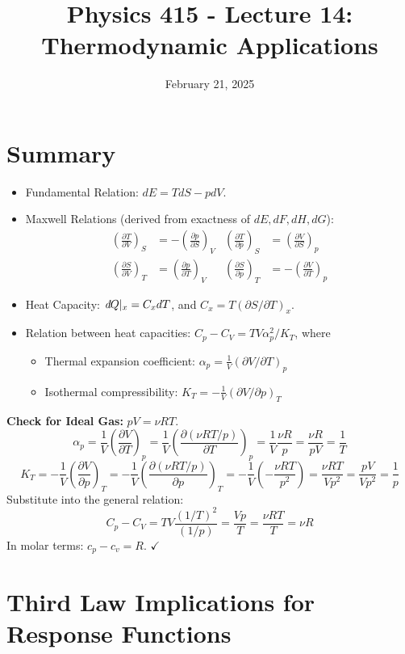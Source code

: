 \documentclass[11pt]{article}
\title{Physics 415 - Lecture 14: Thermodynamic Applications}
\date{February 21, 2025}
\author{} %
\newcommand{\pderiv}[2]{\frac{\partial #1}{\partial #2}}
\newcommand{\ethbar}{\text{\it{đ}}} %
\newcommand{\gasR}{R} %
\begin{document}
\maketitle
\thispagestyle{empty}

\section*{Summary}

\begin{itemize}
    \item Fundamental Relation: $dE = T dS - p dV$.
    \item Maxwell Relations (derived from exactness of $dE, dF, dH, dG$):
    \begin{align*} \left( \pderiv{T}{V} \right)_S &= - \left( \pderiv{p}{S} \right)_V & \left( \pderiv{T}{p} \right)_S &= \left( \pderiv{V}{S} \right)_p \\ \left( \pderiv{S}{V} \right)_T &= \left( \pderiv{p}{T} \right)_V & \left( \pderiv{S}{p} \right)_T &= -\left( \pderiv{V}{T} \right)_p \end{align*}
    \item Heat Capacity: $\ethbar Q|_x = C_x dT$, and $C_x = T (\partial S / \partial T)_x$.
    \item Relation between heat capacities: $C_p - C_V = TV \alpha_p^2 / K_T$, where
    \begin{itemize}
        \item Thermal expansion coefficient: $\alpha_p = \frac{1}{V} (\partial V / \partial T)_p$
        \item Isothermal compressibility: $K_T = -\frac{1}{V} (\partial V / \partial p)_T$
    \end{itemize}
\end{itemize}

\textbf{Check for Ideal Gas:} $pV = \nu \gasR T$.
\[ \alpha_p = \frac{1}{V} \left( \pderiv{V}{T} \right)_p = \frac{1}{V} \left( \pderiv{(\nu \gasR T/p)}{T} \right)_p = \frac{1}{V} \frac{\nu \gasR}{p} = \frac{\nu \gasR}{pV} = \frac{1}{T} \]
\[ K_T = -\frac{1}{V} \left( \pderiv{V}{p} \right)_T = -\frac{1}{V} \left( \pderiv{(\nu \gasR T/p)}{p} \right)_T = -\frac{1}{V} \left( -\frac{\nu \gasR T}{p^2} \right) = \frac{\nu \gasR T}{V p^2} = \frac{pV}{V p^2} = \frac{1}{p} \]
Substitute into the general relation:
\[ C_p - C_V = TV \frac{(1/T)^2}{(1/p)} = \frac{V p}{T} = \frac{\nu \gasR T}{T} = \nu \gasR \]
In molar terms: $c_p - c_v = \gasR$. $\checkmark$

\section*{Third Law Implications for Response Functions}
\end{document}
